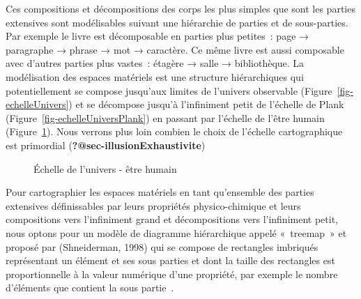 \documentclass[
  a4paper,
  DIV=11,
  numbers=noendperiod]{scrreprt}
\begin{document}
Ces compositions et décompositions des corps les plus simples que sont
les parties extensives sont modélisables suivant une hiérarchie de
parties et de sous-parties. Par exemple le livre est décomposable en
parties plus petites~: page → paragraphe → phrase → mot → caractère. Ce
même livre est aussi composable avec d'autres parties plus vastes~:
étagère → salle → bibliothèque. La modélisation des espaces matériels
est une structure hiérarchiques qui potentiellement se compose jusqu'aux
limites de l'univers observable (Figure~\ref{fig-echelleUnivers}) et se
décompose jusqu'à l'infiniment petit de l'échelle de Plank
(Figure~\ref{fig-echelleUniversPlank}) en passant par l'échelle de
l'être humain (Figure~\ref{fig-echelleHumain}). Nous verrons plus loin
combien le choix de l'échelle cartographique est primordial
(\textbf{?@sec-illusionExhaustivite})

\begin{figure}


\caption{\label{fig-echelleHumain}Échelle de l'univers - être humain}

\end{figure}%

Pour cartographier les espaces matériels en tant qu'ensemble des parties
extensives définissables par leurs propriétés physico-chimique et leurs
compositions vers l'infiniment grand et décompositions vers l'infiniment
petit, nous optons pour un modèle de diagramme hiérarchique appelé
«~treemap~» et proposé par (Shneiderman, 1998) qui se compose de
rectangles imbriqués représentant un élément et ses sous parties et dont
la taille des rectangles est proportionnelle à la valeur numérique d'une
propriété, par exemple le nombre d'éléments que contient la sous
partie~.
\end{document}
